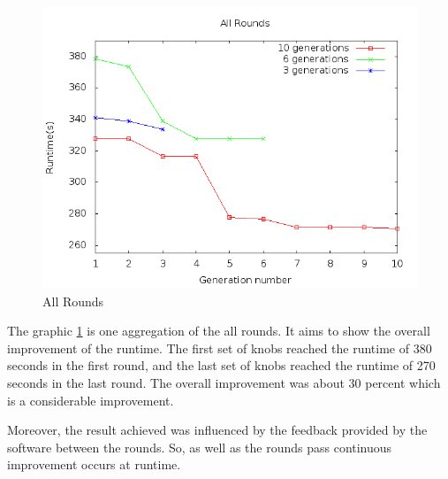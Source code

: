 \begin{figure}[htbp]
\begin{center}
	\includegraphics[scale=0.6]{graphics/img/all.png}
\caption{All Rounds} \label{fig:allgen}
\end{center}
\end{figure}

The graphic \ref{fig:allgen} is one aggregation of the all rounds. It aims
to show the overall improvement of the runtime. The first set of knobs reached
the runtime of 380 seconds in the first round, and the last set of knobs reached
the runtime of 270 seconds in the last round. The overall improvement was about
30 percent which is a considerable improvement.

Moreover, the result achieved was influenced by the feedback provided by the software
between the rounds. So, as well as the rounds pass continuous improvement occurs
at runtime.
